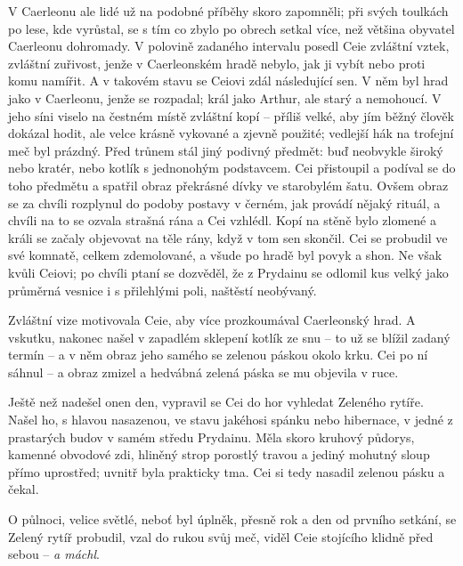 \documentclass[a4paper,twocolumn,openany,nodeprecatedcode, justified]{dndbook}
\begin{document}
	V Caerleonu ale lidé už na podobné příběhy skoro zapomněli; při svých toulkách po lese, kde vyrůstal, se s tím co zbylo po obrech setkal více, než většina obyvatel Caerleonu dohromady. V polovině zadaného intervalu posedl Ceie zvláštní vztek, zvláštní zuřivost, jenže v Caerleonském hradě nebylo, jak ji vybít nebo proti komu namířit. A v takovém stavu se Ceiovi zdál následující sen. V něm byl hrad jako v Caerleonu, jenže se rozpadal; král jako Arthur, ale starý a nemohoucí. V jeho síni viselo na čestném místě zvláštní kopí -- příliš velké, aby jím běžný člověk dokázal hodit, ale velce krásně vykované a zjevně použité; vedlejší hák na trofejní meč byl prázdný. Před trůnem stál jiný podivný předmět: buď neobvykle široký  nebo kratér, nebo kotlík s jednonohým podstavcem. Cei přistoupil a podíval se do toho předmětu a spatřil obraz překrásné dívky ve starobylém šatu. Ovšem obraz se za chvíli rozplynul do podoby postavy v černém, jak provádí nějaký rituál, a chvíli na to se ozvala strašná rána a Cei vzhlédl. Kopí na stěně bylo zlomené a králi se začaly objevovat na těle rány, když v tom sen skončil. Cei se probudil ve své komnatě, celkem zdemolované, a všude po hradě byl povyk a shon. Ne však kvůli Ceiovi; po chvíli ptaní se dozvěděl, že z Prydainu se odlomil kus velký jako průměrná vesnice i s přilehlými poli, naštěstí neobývaný.
	
	Zvláštní vize motivovala Ceie, aby více prozkoumával Caerleonský hrad. A vskutku, nakonec našel v zapadlém sklepení kotlík ze snu -- to už se blížil zadaný termín -- a v něm obraz jeho samého se zelenou páskou okolo krku. Cei po ní sáhnul -- a obraz zmizel a hedvábná zelená páska se mu objevila v ruce.
	
	Ještě než nadešel onen den, vypravil se Cei do hor vyhledat Zeleného rytíře. Našel ho, s hlavou nasazenou, ve stavu jakéhosi spánku nebo hibernace, v jedné z prastarých budov v samém středu Prydainu. Měla skoro kruhový půdorys, kamenné obvodové zdi, hliněný strop porostlý travou a jediný mohutný sloup přímo uprostřed; uvnitř byla prakticky tma. Cei si tedy nasadil zelenou pásku a čekal.
	
	O půlnoci, velice světlé, neboť byl úplněk, přesně rok a den od prvního setkání, se Zelený rytíř probudil, vzal do rukou svůj meč, viděl Ceie stojícího klidně před sebou -- \emph{a máchl}.
	
	\vspace{1\baselineskip}
	
\end{document}
